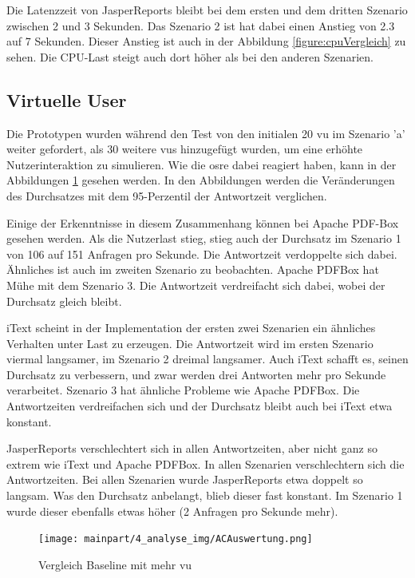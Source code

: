 \documentclass[main.tex]{subfiles}
\begin{document}
Die Latenzzeit von JasperReports bleibt bei dem ersten und dem dritten Szenario zwischen 2 und 3 Sekunden. Das Szenario 2 ist hat dabei einen Anstieg von 2.3 auf 7 Sekunden. Dieser Anstieg ist auch in der Abbildung \ref{figure:cpuVergleich} zu sehen. Die CPU-Last steigt auch dort höher als bei den anderen Szenarien. 


\subsection{Virtuelle User}
Die Prototypen wurden während den Test von den initialen 20 \acrshort{vu} im Szenario 'a' weiter gefordert, als 30 weitere \acrshort{vu}s hinzugefügt wurden, um eine erhöhte Nutzerinteraktion zu simulieren. Wie die \acrshort{osre} dabei reagiert haben, kann in der Abbildungen  \ref{figure:vglACVU} gesehen werden. In den Abbildungen werden die Veränderungen des Durchsatzes mit dem  95-Perzentil der Antwortzeit verglichen.


Einige der Erkenntnisse in diesem Zusammenhang können bei Apache PDF-Box gesehen werden. Als die Nutzerlast stieg, stieg auch der Durchsatz im Szenario 1 von 106 auf 151 Anfragen pro Sekunde. Die Antwortzeit verdoppelte sich dabei. Ähnliches ist auch im zweiten Szenario zu beobachten. Apache PDFBox hat Mühe mit dem Szenario 3. Die Antwortzeit verdreifacht sich dabei, wobei der Durchsatz gleich bleibt.

iText scheint in der Implementation der ersten zwei Szenarien ein ähnliches Verhalten unter Last zu erzeugen. Die Antwortzeit wird im ersten Szenario viermal langsamer, im Szenario 2 dreimal langsamer. Auch iText schafft es, seinen Durchsatz zu verbessern, und zwar werden drei Antworten mehr pro Sekunde verarbeitet. Szenario 3 hat ähnliche Probleme wie Apache PDFBox. Die Antwortzeiten verdreifachen sich und der Durchsatz bleibt auch bei iText etwa konstant.

JasperReports verschlechtert sich in allen Antwortzeiten, aber nicht ganz so extrem wie iText und Apache PDFBox. In allen Szenarien verschlechtern sich die Antwortzeiten. Bei allen Szenarien wurde JasperReports etwa doppelt so langsam. Was den Durchsatz anbelangt, blieb dieser fast konstant. Im Szenario 1 wurde dieser ebenfalls etwas höher (2 Anfragen pro Sekunde mehr).


\begin{figure}[H]
\centering
\texttt{[image: mainpart/4\_analyse\_img/ACAuswertung.png]}
 \caption{Vergleich Baseline mit mehr \acrshort{vu}}
 \label{figure:vglACVU}
\end{figure}
\end{document}
